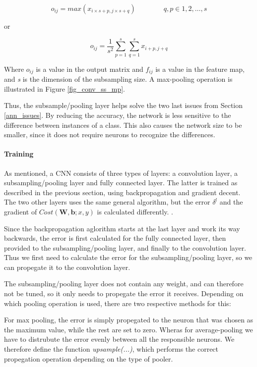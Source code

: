 \begin{equation}
o_{ij} = max(x_{i \times s+p, j \times s+q}) \qquad\qquad q,p \in 1, 2, \dots, s
\end{equation}

or

\begin{equation}
o_{ij} = \frac{1}{s^2} \sum_{p=1}^{s}\sum_{q=1}^{s} x_{i+p, j+q}
\end{equation}

Where $ o_{ij} $ is a value in the output matrix and $ f_{ij} $ is a value in the feature map, and \textit{s} is the dimension of the subsampling size. A max-pooling operation is illustrated in Figure \ref{fig_conv_ss_mp}.

Thus, the subsample/pooling layer helps solve the two last issues from Section \ref{ann_issues}. By reducing the accuracy, the network is less sensitive to the difference between instances of a class. This also causes the network size to be smaller, since it does not require neurons to recognize the differences. 



\paragraph{Training} \hfill \break
As mentioned, a CNN consists of three types of layers: a convolution layer, a subsampling/pooling layer and fully connected layer. The latter is trained as described in the previous section, using backpropagation and gradient decent. The two other layers uses the same general algorithm, but the error $ \delta^l $ and the gradient of $ Cost(\mathbf{W,b}; x, y) $ is calculated differently. . 

Since the backpropagation aglorithm starts at the last layer and work its way backwards, the error is first calculated for the fully connected layer, then provided to the subsampling/pooling layer, and finally to the convolution layer. Thus we first need to calculate the error for the subsampling/pooling layer, so we can propegate it to the convolution layer. 

The subsampling/pooling layer does not contain any weight, and can therefore not be tuned, so it only needs to propegate the error it receives. Depending on which pooling operation is used, there are two respective methods for this:

For max pooling, the error is simply propegated to the neuron that was chosen as the maximum value, while the rest are set to zero. Wheras for average-pooling we have to distrubute the error evenly between all the responsible neurons. We therefore define the function \textit{upsample(...)}, which performs the correct propegation operation depending on the type of pooler. 

